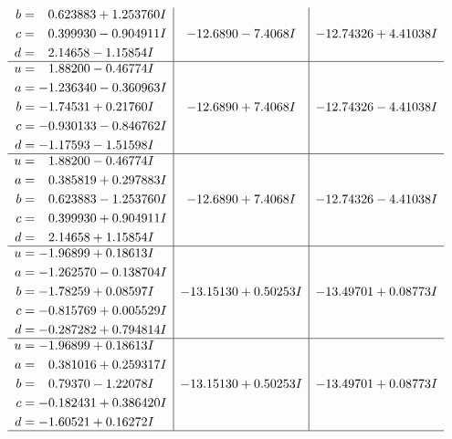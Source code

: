 \documentclass[1p]{elsarticle_modified}
\theoremstyle{definition}
\begin{document}
$$\begin{array}{c|c|c}
\begin{aligned}
b &= \phantom{-}0.623883 + 1.253760 I \\
c &= \phantom{-}0.399930 - 0.904911 I \\
d &= \phantom{-}2.14658 - 1.15854 I\end{aligned}
 & -12.6890 - 7.4068 I & -12.74326 + 4.41038 I \\ \hline\begin{aligned}
u &= \phantom{-}1.88200 - 0.46774 I \\
a &= -1.236340 - 0.360963 I \\
b &= -1.74531 + 0.21760 I \\
c &= -0.930133 - 0.846762 I \\
d &= -1.17593 - 1.51598 I\end{aligned}
 & -12.6890 + 7.4068 I & -12.74326 - 4.41038 I \\ \hline\begin{aligned}
u &= \phantom{-}1.88200 - 0.46774 I \\
a &= \phantom{-}0.385819 + 0.297883 I \\
b &= \phantom{-}0.623883 - 1.253760 I \\
c &= \phantom{-}0.399930 + 0.904911 I \\
d &= \phantom{-}2.14658 + 1.15854 I\end{aligned}
 & -12.6890 + 7.4068 I & -12.74326 - 4.41038 I \\ \hline\begin{aligned}
u &= -1.96899 + 0.18613 I \\
a &= -1.262570 - 0.138704 I \\
b &= -1.78259 + 0.08597 I \\
c &= -0.815769 + 0.005529 I \\
d &= -0.287282 + 0.794814 I\end{aligned}
 & -13.15130 + 0.50253 I & -13.49701 + 0.08773 I \\ \hline\begin{aligned}
u &= -1.96899 + 0.18613 I \\
a &= \phantom{-}0.381016 + 0.259317 I \\
b &= \phantom{-}0.79370 - 1.22078 I \\
c &= -0.182431 + 0.386420 I \\
d &= -1.60521 + 0.16272 I\end{aligned}
 & -13.15130 + 0.50253 I & -13.49701 + 0.08773 I\\
 \hline 
 \end{array}$$\newpage$$\begin{array}{c|c|c}  

\end{array}$$
\end{document}
